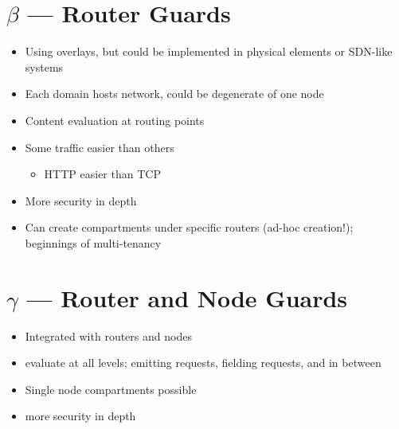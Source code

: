 \documentclass[10pt,letterpaper]{article}
\begin{document}
\section*{$\beta$ --- Router Guards}
\begin{itemize}
\item Using overlays, but could be implemented in physical elements or SDN-like systems
\item Each domain hosts network, could be degenerate of one node
\item Content evaluation at routing points
\item Some traffic easier than others
\begin{itemize}
\item HTTP easier than TCP
\end{itemize}
\item More security in depth
\item Can create compartments under specific routers (ad-hoc creation!); beginnings of multi-tenancy
\end{itemize}

\section*{$\gamma$ --- Router and Node Guards}
\begin{itemize}
\item Integrated with routers and nodes
\item evaluate at all levels; emitting requests, fielding requests, and in between
\item Single node compartments possible
\item more security in depth
\end{itemize}
\end{document}
